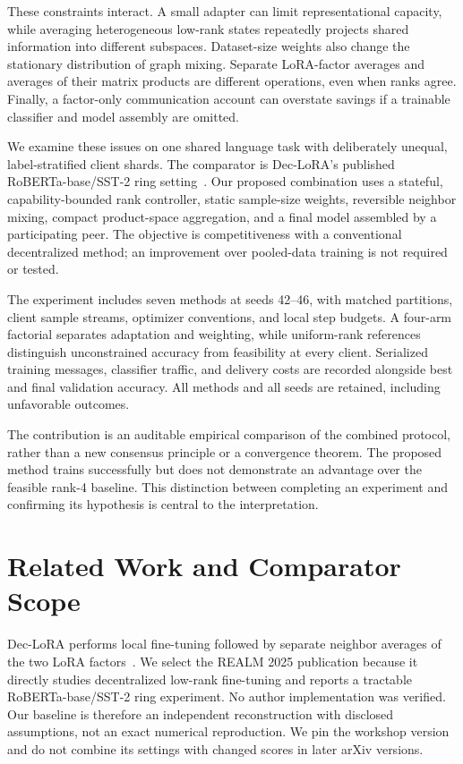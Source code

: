 \documentclass[11pt]{article}
\begin{document}
These constraints interact. A small adapter can limit representational capacity, while averaging heterogeneous low-rank states repeatedly projects shared information into different subspaces. Dataset-size weights also change the stationary distribution of graph mixing. Separate LoRA-factor averages and averages of their matrix products are different operations, even when ranks agree. Finally, a factor-only communication account can overstate savings if a trainable classifier and model assembly are omitted.

We examine these issues on one shared language task with deliberately unequal, label-stratified client shards. The comparator is Dec-LoRA's published RoBERTa-base/SST-2 ring setting~\citep{ghiasvand2025declora}. Our proposed combination uses a stateful, capability-bounded rank controller, static sample-size weights, reversible neighbor mixing, compact product-space aggregation, and a final model assembled by a participating peer. The objective is competitiveness with a conventional decentralized method; an improvement over pooled-data training is not required or tested.

The experiment includes seven methods at seeds 42--46, with matched partitions, client sample streams, optimizer conventions, and local step budgets. A four-arm factorial separates adaptation and weighting, while uniform-rank references distinguish unconstrained accuracy from feasibility at every client. Serialized training messages, classifier traffic, and delivery costs are recorded alongside best and final validation accuracy. All methods and all seeds are retained, including unfavorable outcomes.

The contribution is an auditable empirical comparison of the combined protocol, rather than a new consensus principle or a convergence theorem. The proposed method trains successfully but does not demonstrate an advantage over the feasible rank-4 baseline. This distinction between completing an experiment and confirming its hypothesis is central to the interpretation.

\section{Related Work and Comparator Scope}
Dec-LoRA performs local fine-tuning followed by separate neighbor averages of the two LoRA factors~\citep{ghiasvand2025declora}. We select the REALM 2025 publication because it directly studies decentralized low-rank fine-tuning and reports a tractable RoBERTa-base/SST-2 ring experiment. No author implementation was verified. Our baseline is therefore an independent reconstruction with disclosed assumptions, not an exact numerical reproduction. We pin the workshop version and do not combine its settings with changed scores in later arXiv versions.
\end{document}
